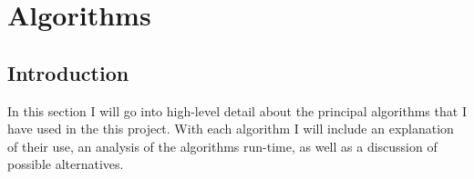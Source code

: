 
\section{Algorithms}
\label{algorithms}

\subsection{Introduction}
In this section I will go into high-level detail about the principal algorithms that I have used in the this project. With each algorithm I will include an explanation of their use, an analysis of the algorithms run-time, as well as a discussion of possible alternatives. 
